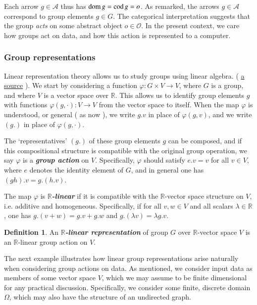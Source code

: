 \documentclass[12pt]{article}
\numberwithin{equation}{section}
\theoremstyle{definition}
\newtheorem{defn}[thm]{Definition}
\newcommand{		\R		}	{	\mathbb{R}				}
\newcommand{		\dom		}	{	{\text{\rm dom\,}}		}
\newcommand{		\cod		}	{	{\text{\rm cod\,}}		}
\newcommand{		\B		}	{\textbf					} %
\newcommand{		\Oh		}	{	\Omega					}
\newcommand{		\1		}	{	\bm{1}					}%
\begin{document}
     Each arrow $g \in \mathcal{A}$ thus has $\dom g = \cod g = o$. As remarked, the arrows $g \in \mathcal{A}$ correspond to group elements $g \in G$. The categorical interpretation suggests that the group \emph{acts} on some abstract object $o \in \mathcal{O}$. In the present context, we care how groups act on data, and how this action is represented to a computer. 

\subsubsection*{Group representations}

Linear representation theory allows us to study groups using linear algebra. ( \href{https://wlou.blog/2018/06/22/a-first-impression-of-group-representations/}{a source} ). We start by considering a function $\varphi : G \times V \to V$, where $G$ is a group, and where $V$ is a vector space over $\R$. This allows us to identify group elements $g$ with functions $\varphi(g, \cdot) : V \to V$ from the vector space to itself. When the map $\varphi$ is understood, or general ( as now ), we write $g.v$ in place of $\varphi(g,v)$, and we write $(g.)$ in place of $\varphi(g, \cdot)$. 

The `representatives' $(g.)$ of these group elements $g$ can be composed, and if this compositional structure is compatible with the original group operation, we say $\varphi$ is a \emph{\B{group action}} on $V$. Specifically, $\varphi$ should satisfy $e.v = v$ for all $v \in V$, where $e$ denotes the identity element of $G$, and in general one has $(gh).v  = g.(h.v)$. 

The map $\varphi$ is \emph{\B{$\R$-linear}} if it is compatible with the $\R$-vector space structure on $V$, i.e. additive and homogeneous. Specifically, if for all $v,w \in V$ and all scalars $\lambda \in \R$, one has $g.(v+w) = g.v + g.w$ and $g.(\lambda v) = \lambda g.v$. 


\begin{defn} 
\label{def:R_lin_rep}
An \emph{\B{$\mathbb{R}$-linear representation}} of group $G$ over $\mathbb{R}$-vector space $V$ is an $\mathbb{R}$-linear group action on $V$.
\end{defn}


The next example illustrates how linear group representations arise naturally when considering group actions on data. As mentioned, we consider input data as members of some vector space $V$, which we may assume to be finite dimensional for any practical discussion. Specifically, we consider some finite, discrete domain $\Oh$, which may also have the structure of an undirected graph. 
\end{document}
